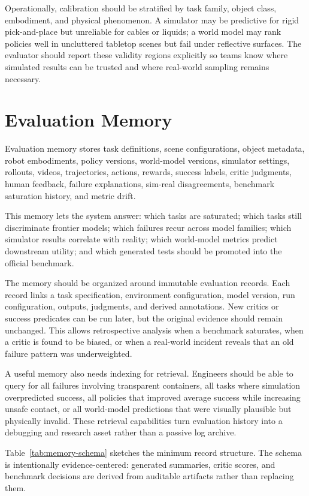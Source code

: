 \documentclass[sigconf,review,anonymous]{acmart}
\begin{document}
Operationally, calibration should be stratified by task family, object class, embodiment, and physical phenomenon. A simulator may be predictive for rigid pick-and-place but unreliable for cables or liquids; a world model may rank policies well in uncluttered tabletop scenes but fail under reflective surfaces. The evaluator should report these validity regions explicitly so teams know where simulated results can be trusted and where real-world sampling remains necessary.

\section{Evaluation Memory}

Evaluation memory stores task definitions, scene configurations, object metadata, robot embodiments, policy versions, world-model versions, simulator settings, rollouts, videos, trajectories, actions, rewards, success labels, critic judgments, human feedback, failure explanations, sim-real disagreements, benchmark saturation history, and metric drift.

This memory lets the system answer: which tasks are saturated; which tasks still discriminate frontier models; which failures recur across model families; which simulator results correlate with reality; which world-model metrics predict downstream utility; and which generated tests should be promoted into the official benchmark.

The memory should be organized around immutable evaluation records. Each record links a task specification, environment configuration, model version, run configuration, outputs, judgments, and derived annotations. New critics or success predicates can be run later, but the original evidence should remain unchanged. This allows retrospective analysis when a benchmark saturates, when a critic is found to be biased, or when a real-world incident reveals that an old failure pattern was underweighted.

A useful memory also needs indexing for retrieval. Engineers should be able to query for all failures involving transparent containers, all tasks where simulation overpredicted success, all policies that improved average success while increasing unsafe contact, or all world-model predictions that were visually plausible but physically invalid. These retrieval capabilities turn evaluation history into a debugging and research asset rather than a passive log archive.

Table~\ref{tab:memory-schema} sketches the minimum record structure. The schema is intentionally evidence-centered: generated summaries, critic scores, and benchmark decisions are derived from auditable artifacts rather than replacing them.
\end{document}
